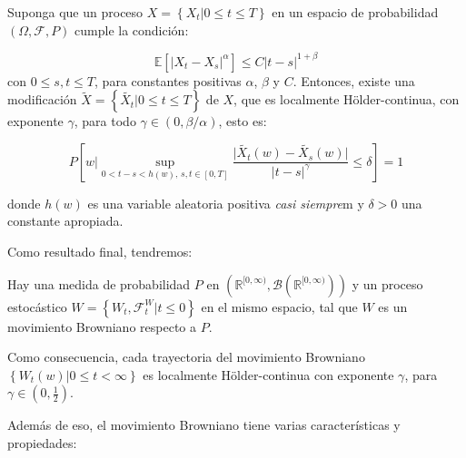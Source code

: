 \begin{theorem}
	Suponga que un proceso $X = \left\{  X_t \vert 0 \leq t \leq T \right\}$ en un espacio de probabilidad $(\Omega, \mathcal{F}, P)$ cumple la condición:

	\[
		\mathbb{E}[ \lvert X_t - X_s \rvert^{\alpha} ] \leq C \lvert t - s \rvert^{ 1 + \beta}
	\]
	con $0 \leq s, t \leq T$, para constantes positivas $\alpha$, $\beta$ y $C$. Entonces, existe una modificación $\tilde{X} = \left\{ \tilde{X_t} \vert  0 \leq t \leq T  \right\}$ de $X$, que es localmente Hölder-continua, con exponente $\gamma$, para todo $\gamma \in (0, \beta / \alpha)$, esto es:

	\[
		P \left[ w \vert \sup_{  0 < t - s < h(w)\text{, } s,t\in [0,T]}  \frac{\lvert  \tilde{X_t}(w) - \tilde{X_s}(w) \rvert }{\lvert t - s \rvert^{\gamma}}  \leq \delta \right] = 1
	\]

	donde $h(w)$ es una variable aleatoria positiva \textit{casi siempre}m y $\delta > 0$ una constante apropiada.

\end{theorem}

Como resultado final, tendremos:

\begin{coro}
	Hay una medida de probabilidad $P$ en $(\mathbb{R}^{ [0, \infty) }, \mathcal{B}(\mathbb{R}^{ [0, \infty) })  )$ y un proceso estocástico $W = \left\{ W_t, \mathcal{F}_t^W \vert t \leq 0 \right\}$ en el mismo espacio, tal que $W$ es un movimiento Browniano respecto a $P$.
\end{coro}

Como consecuencia, cada trayectoria del movimiento Browniano $\left\{ W_t(w) \vert 0 \leq t < \infty \right\}$ es localmente Hölder-continua con exponente $\gamma$, para $\gamma \in \left(0, \frac{1}{2}\right)$.


Además de eso, el movimiento Browniano tiene varias características y propiedades: